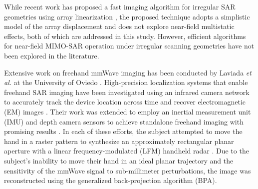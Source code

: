 \documentclass{ieeeaccess}
\begin{document}
While recent work has proposed a fast imaging algorithm for irregular SAR geometries using array linearization \cite{zeng2021aperturelinearization}, the proposed technique adopts a simplistic model of the array displacement and does not explore near-field multistatic effects, both of which are addressed in this study. 
However, efficient algorithms for near-field MIMO-SAR operation under irregular scanning geometries have not been explored in the literature. 

Extensive work on freehand mmWave imaging has been conducted by Laviada \textit{et al.} at the University of Oviedo \cite{alvarez2019freehand,alvarez2021freehand,alvarez2021freehandsystem,alvarez2021system,alvarez2021towards,garcia20203DSARProcessing,wu2020multilayered}.
High-precision localization systems that enable freehand SAR imaging have been investigated using an infrared camera network to accurately track the device location across time and recover electromagnetic (EM) images \cite{alvarez2019freehand}.
Their work was extended to employ an inertial measurement unit (IMU) and depth camera sensors to achieve standalone freehand imaging with promising results \cite{alvarez2021towards,alvarez2021system}.
In each of these efforts, the subject attempted to move the hand in a raster pattern to synthesize an approximately rectangular planar aperture with a linear frequency-modulated (LFM) handheld radar \cite{alvarez2019freehand,alvarez2021freehand,alvarez2021towards}. 
Due to the subject's inability to move their hand in an ideal planar trajectory and the sensitivity of the mmWave signal to sub-millimeter perturbations, the image was reconstructed using the generalized back-projection algorithm (BPA). 
\end{document}
